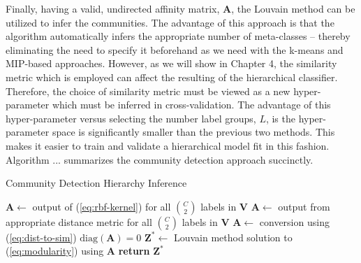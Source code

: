 \documentclass[../thesis.tex]{subfiles}
\begin{document}
Finally, having a valid, undirected affinity matrix, $\mathbf{A}$, the Louvain
method can be utilized to infer the communities. The advantage of this approach
is that the algorithm automatically infers the appropriate number of
meta-classes -- thereby eliminating the need to specify it beforehand as we need
with the k-means and MIP-based approaches. However, as we will show in Chapter
4, the similarity metric which is employed can affect the resulting of the
hierarchical classifier. Therefore, the choice of similarity metric must be
viewed as a new hyper-parameter which must be inferred in cross-validation. The
advantage of this hyper-parameter versus selecting the number label groups, $L$,
is the hyper-parameter space is significantly smaller than the previous two
methods. This makes it easier to train and validate a hierarchical model fit in
this fashion. Algorithm ... summarizes the community detection approach
succinctly.
\begin{algorithm}
    \caption{Community Detection Hierarchy Inference}
    \label{alg:comm-detect}
    \begin{algorithmic}[1]
                \State $\mathbf{A} \gets $ output of (\ref{eq:rbf-kernel})
                for all $\binom{C}{2}$ labels in $\mathbf{V}$
            \Else{}
                \State $\mathbf{A} \gets$ output from appropriate distance
                metric for all $\binom{C}{2}$ labels in $\mathbf{V}$
                \State $\mathbf{A} \gets$ conversion using (\ref{eq:dist-to-sim})
            \EndIf
            \State $\text{diag}(\mathbf{A}) = 0$ 
            \State $\mathbf{Z}^* \gets$ Louvain method solution to
            (\ref{eq:modularity}) using $\mathbf{A}$
            \State \textbf{return} $\mathbf{Z}^*$
        \EndProcedure
    \end{algorithmic}
\end{algorithm}
\end{document}
